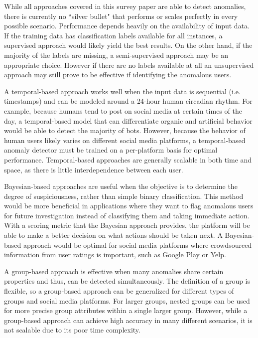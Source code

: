 \documentclass[11pt, oneside]{article}   	%
\begin{document}
\quad While all approaches covered in this survey paper are able to detect anomalies, there is currently no ``silver bullet" that performs or scales perfectly in every possible scenario.
Performance depends heavily on the availability of input data.
If the training data has classification labels available for all instances, a supervised approach would likely yield the best results.
On the other hand, if the majority of the labels are missing, a semi-supervised approach may be an appropriate choice. However if there are no labels available at all an unsupervised approach may still prove to be effective if identifying the anomalous users.

\quad A temporal-based approach works well when the input data is sequential (i.e. timestamps) and can be modeled around a 24-hour human circadian rhythm.
For example, because humans tend to post on social media at certain times of the day, a temporal-based model that can differentiate organic and artificial behavior would be able to detect the majority of bots.
However, because the behavior of human users likely varies on different social media platforms, a temporal-based anomaly detector must be trained on a per-platform basis for optimal performance.
Temporal-based approaches are generally scalable in both time and space, as there is little interdependence between each user.

\quad Bayesian-based approaches are useful when the objective is to determine the degree of suspiciousness, rather than simple binary classification.
This method would be more beneficial in applications where they want to flag anomalous users for future investigation instead of classifying them and taking immediate action. With a scoring metric that the Bayesian approach provides, the platform will be able to make a better decision on what actions should be taken next.
A Bayesian-based approach would be optimal for social media platforms where crowdsourced information from user ratings is important, such as Google Play or Yelp.

\quad A group-based approach is effective when many anomalies share certain properties and thus, can be detected simultaneously.
The definition of a group is flexible, so a group-based approach can be generalized for different types of groups and social media platforms.
For larger groups, nested groups can be used for more precise group attributes within a single larger group.
However, while a group-based approach can achieve high accuracy in many different scenarios, it is not scalable due to its poor time complexity.
\end{document}
